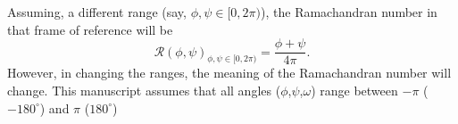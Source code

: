 \documentclass[fleqn,10pt,lineno]{wlpeerj} %
\begin{document}
Assuming, a different range (say, $\phi,\psi \in [0,2\pi)$), the Ramachandran number in that frame of reference will be
\begin{equation}
{\mathcal{R}}(\phi,\psi)_{\phi,\psi \in [0,2\pi)} = \frac{\phi+\psi}{4\pi}.
\label{ramaGeneral}
\end{equation}
However, in changing the ranges, the meaning of the Ramachandran number will change. This manuscript assumes that all angles ($\phi$,$\psi$,$\omega$) range between $-\pi$ ($-180^\circ$) and $\pi$ ($180^\circ$)


\end{document}
